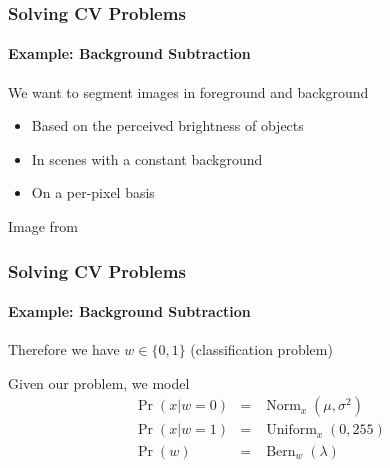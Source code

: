 \documentclass[xetex,professionalfont]{beamer}
\DeclareMathOperator*{\Norm}{Norm}
\DeclareMathOperator*{\Uniform}{Uniform}
\DeclareMathOperator*{\Bern}{Bern}
\begin{document}

\begin{frame}
\frametitle{Solving CV Problems}
\framesubtitle{Example: Background Subtraction}


We want to segment images in foreground and background
\begin{itemize}
    \item Based on the perceived brightness of objects
    \item In scenes with a constant background
    \item On a per-pixel basis
\end{itemize}

\begin{center}
    {\centering Image from \cite{prince12}}
\end{center}

\end{frame}


\begin{frame}
\frametitle{Solving CV Problems}
\framesubtitle{Example: Background Subtraction}

Therefore we have $w\in\{0,1\}$ (classification problem)

\bigskip
Given our problem, we model %
\begin{eqnarray*}
    \Pr(x|w=0)&=&\Norm_{x}(\mu,\sigma^2)\\ %
    \Pr(x|w=1)&=&\Uniform_x(0, 255) \\ %
    \Pr(w)&=&\Bern_w(\lambda) %
\end{eqnarray*}

\end{frame}
\end{document}
